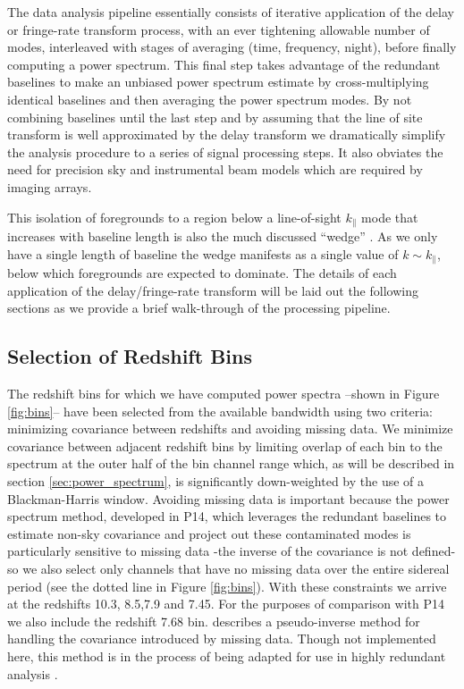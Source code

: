 \documentclass[preprint]{aastex}
\begin{document}
The data analysis pipeline essentially consists of iterative application of the delay or fringe-rate transform process, with an ever tightening allowable number of modes, interleaved with stages of averaging (time, frequency, night), before finally computing a power spectrum.  This final step takes advantage of the redundant baselines to make an unbiased power spectrum estimate by cross-multiplying identical baselines and then averaging the power spectrum modes. By not combining baselines until the last step and by assuming that the line of site transform is well approximated by the delay transform we dramatically simplify the analysis procedure to a series of signal processing steps. It also obviates the need for precision sky and instrumental beam models which are required by imaging arrays.  

This isolation of foregrounds to a region below a line-of-sight $k_\parallel$ mode that increases with baseline length is also the much discussed ``wedge'' \cite{Liu:2014p10462,Liu:2014p10463,Thyagarajan:2013p10039,Pober:2013p9942,Trott:2012p10466,Morales:2012p8790,Parsons:2012p8896,Vedantham:2012p10297,Datta:2010p8781,Parsons:2009p7859}. As we only have a single length of baseline the wedge manifests as a single value of $k\sim k_\parallel$, below which foregrounds are expected to dominate.  The details of each application of the delay/fringe-rate transform will be laid out the following sections as we provide a brief walk-through of the processing pipeline. 


\subsection{Selection of Redshift Bins}
The redshift bins for which we have computed power spectra --shown in Figure \ref{fig:bins}-- have been selected from the available bandwidth using two criteria: minimizing covariance between redshifts and avoiding missing data. We minimize covariance between adjacent redshift bins by limiting overlap of each bin to the spectrum at the outer half of the bin channel range which, as will be described in section \ref{sec:power_spectrum}, is significantly down-weighted by the use of a Blackman-Harris window.   Avoiding missing data is important because the power spectrum method, developed in P14, which leverages the redundant baselines to estimate non-sky covariance and project out these contaminated modes is particularly sensitive to missing data -the inverse of the covariance is not defined- so we also select only channels that have no missing data over the entire sidereal period (see the dotted line in Figure \ref{fig:bins}).  With these constraints we arrive at the redshifts 10.3, 8.5,7.9 and 7.45.  For the purposes of comparison with P14 we also include the redshift 7.68 bin.  \citet{Dillon:2013p10497} describes a pseudo-inverse method for handling the covariance introduced by missing data. Though not implemented here, this method is in the process of being adapted for use in highly redundant analysis \citep{Liu:2014p10462,Liu:2014p10463}.  
\end{document}
